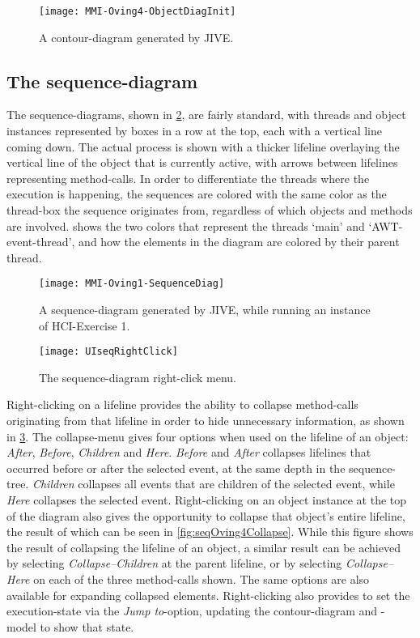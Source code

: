 \begin{figure}[ht]
	\centering
	\texttt{[image: MMI-Oving4-ObjectDiagInit]}
	\caption{A contour-diagram generated by JIVE.}
	\label{fig:contOving4Init}
\end{figure}

\subsection{The sequence-diagram}\label{jiveFeatSequenceDiag}
The sequence-diagrams, shown in \cref{fig:seqOving1}, are fairly standard, with threads and object instances represented by boxes in a row at the top, each with a vertical line coming down.
The actual process is shown with a thicker lifeline overlaying the vertical line of the object that is currently active, with arrows between lifelines representing method-calls.
In order to differentiate the threads where the execution is happening, the sequences are colored with the same color as the thread-box the sequence originates from, regardless of which objects and methods are involved.
 shows the two colors that represent the threads `main' and `AWT-event-thread', and how the elements in the diagram are colored by their parent thread.

\begin{figure}[H]
	\centering
	\texttt{[image: MMI-Oving1-SequenceDiag]}
	\caption{A sequence-diagram generated by JIVE, while running an instance of HCI-Exercise 1.}
	\label{fig:seqOving1}
\end{figure}

\begin{figure}[H]
	\centering
	\texttt{[image: UIseqRightClick]}
	\caption{The sequence-diagram right-click menu.}
	\label{fig:UIseqRightClick}
\end{figure}

Right-clicking on a \gls{lifeline} provides the ability to collapse method-calls originating from that lifeline in order to hide unnecessary information, as shown in \cref{fig:UIseqRightClick}.
The collapse-menu gives four options when used on the lifeline of an object: \emph{After}, \emph{Before}, \emph{Children} and \emph{Here}.
\emph{Before} and \emph{After} collapses lifelines that occurred before or after the selected event, at the same depth in the sequence-tree.
\emph{Children} collapses all events that are children of the selected event, while \emph{Here} collapses the selected event.
Right-clicking on an object instance at the top of the diagram also gives the opportunity to collapse that object's entire lifeline, the result of which can be seen in \cref{fig:seqOving4Collapse}.
While this figure shows the result of collapsing the lifeline of an object, a similar result can be achieved by selecting \emph{Collapse--Children} at the parent lifeline, or by selecting \emph{Collapse--Here} on each of the three method-calls shown.
The same options are also available for expanding collapsed elements.
Right-clicking also provides to set the execution-state via the \emph{Jump to}-option, updating the contour-diagram and -model to show that state.

